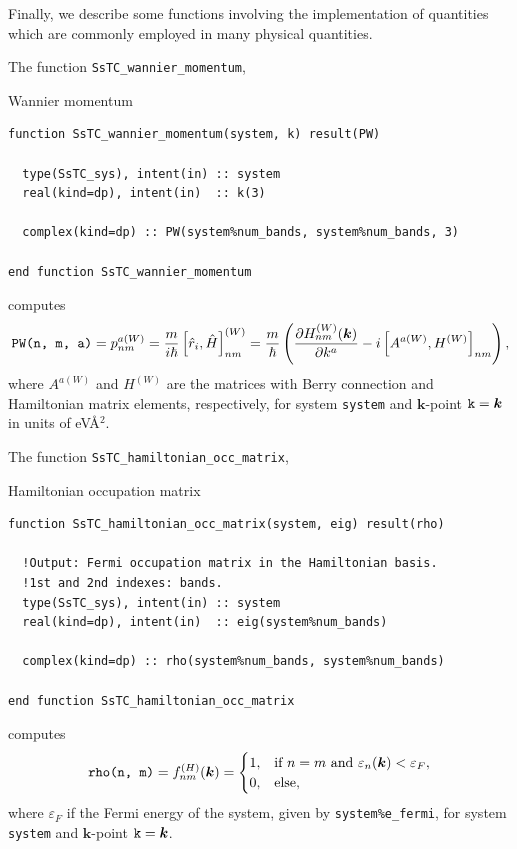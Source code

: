 \documentclass[10pt,a4paper]{article}
\begin{document}
Finally, we describe some functions involving the implementation of quantities which are commonly employed in many physical quantities.

The function \verb|SsTC_wannier_momentum|,
\begin{codebox}{Wannier momentum}
\begin{lstlisting}[caption={Interface of ``Wannier momentum".},captionpos=b]
function SsTC_wannier_momentum(system, k) result(PW)

  type(SsTC_sys), intent(in) :: system
  real(kind=dp), intent(in)  :: k(3)

  complex(kind=dp) :: PW(system%num_bands, system%num_bands, 3)

end function SsTC_wannier_momentum
\end{lstlisting}
\end{codebox}
computes \cite{sakuraiModernQuantumMechanics2017, parkerDiagrammaticApproachNonlinear2019}
\begin{equation}
\verb|PW(n, m, a)| = p^{a(W)}_{nm} = \frac{m}{i\hbar}\left[\hat{r}_i, \hat{H}\right]^{(W)}_{nm}=\frac{m}{\hbar}\left(\frac{\partial H_{nm}^{(W)}(\bm{k})}{\partial k^a} - i\left[A^{a(W)},H^{(W)}\right]_{nm} \right),
\end{equation}
where $A^{a(W)}$ and $H^{(W)}$ are the matrices with Berry connection and Hamiltonian matrix elements, respectively, for system \verb|system| and $\bm{k}$-point $\verb|k| = \bm{k}$ in units of eV\r{A}$^2$.

The function \verb|SsTC_hamiltonian_occ_matrix|,
\begin{codebox}{Hamiltonian occupation matrix}
\begin{lstlisting}[caption={Interface of ``Hamiltonian occupation matrix".},captionpos=b]
function SsTC_hamiltonian_occ_matrix(system, eig) result(rho)

  !Output: Fermi occupation matrix in the Hamiltonian basis.
  !1st and 2nd indexes: bands.
  type(SsTC_sys), intent(in) :: system
  real(kind=dp), intent(in)  :: eig(system%num_bands)

  complex(kind=dp) :: rho(system%num_bands, system%num_bands)

end function SsTC_hamiltonian_occ_matrix
\end{lstlisting}
\end{codebox}
computes
\begin{equation}
\verb|rho(n, m)| = f_{nm}^{(H)}(\bm{k}) = \begin{cases}
1, & \text{if }n = m \text{ and } \varepsilon_n(\bm{k})<\varepsilon_F, \\
0, &\text{else},
\end{cases}
\end{equation}
where $\varepsilon_F$ if the Fermi energy of the system, given by \verb|system%e_fermi|, for system \verb|system| and $\bm{k}$-point $\verb|k| = \bm{k}$.
\end{document}
